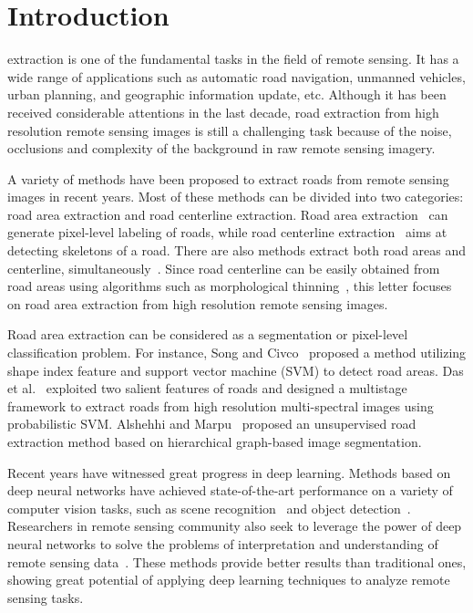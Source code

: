 \documentclass[journal]{IEEEtran}
\begin{document}
\section{Introduction}
 extraction is one of the fundamental tasks in the field of remote sensing. It has a wide range of applications such as automatic road navigation, unmanned vehicles, urban planning, and geographic information update, etc. Although it has been received considerable attentions in the last decade, road extraction from high resolution remote sensing images is still a challenging task because of the noise, occlusions and complexity of the background in raw remote sensing imagery.

A variety of methods have been proposed to extract roads from remote sensing images in recent years. Most of these methods can be divided into two categories: road area extraction and road centerline extraction. Road area  extraction~\cite{Xin2009Road,mnih2010learning,Unsalan2012Road,Cheng2015Urban,Saito2016Multiple,Alshehhi2017Hierarchical} can generate pixel-level labeling of roads, while road centerline extraction~\cite{Liu2015Main,Sujatha2015Connected} aims at detecting skeletons of a road. There are also methods extract both road areas and centerline, simultaneously~\cite{Cheng2017Automatic}. Since road centerline can be easily obtained from road areas using algorithms such as morphological thinning~\cite{Cheng2016Road}, this letter focuses on road area extraction from high resolution remote sensing images.

Road area extraction can be considered as a segmentation or pixel-level classification problem. For instance, Song and Civco~\cite{Song2004Road} proposed a method utilizing shape index feature and support vector machine (SVM) to detect road areas. Das et al.~\cite{Das2011Use} exploited two salient features of roads and designed a multistage framework to extract roads from high resolution multi-spectral images using probabilistic SVM. Alshehhi and Marpu~\cite{Alshehhi2017Hierarchical} proposed an unsupervised road extraction method based on hierarchical graph-based image segmentation.

Recent years have witnessed great progress in deep learning. Methods based on deep neural networks have achieved state-of-the-art performance on a variety of computer vision tasks, such as scene recognition~\cite{Zhou2014Learning} and object detection~\cite{Ren2017Faster}. Researchers in remote sensing community also seek to leverage the power of deep neural networks to solve the problems of interpretation and understanding of remote sensing data~\cite{mnih2010learning,mnih2012learning,zhang2016cnn,Saito2016Multiple,Zhang2016Deep,zhang2016functional}. These methods provide better results than traditional ones, showing great potential of applying deep learning techniques to analyze remote sensing tasks.
\end{document}

